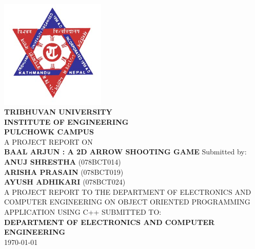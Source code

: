 
\begin{titlepage}
	
	\newcommand{\HRule}{\rule{\linewidth}{0.3mm}}
	\centering
	\vfill
	\includegraphics[width=50mm]{images/tu.jpg}\\[0.75cm]
	\textsc{\Large \bfseries  TRIBHUVAN UNIVERSITY}\\[0.25cm] %
	\textsc{\Large \bfseries INSTITUTE OF ENGINEERING}\\[0.25cm]
	\textsc{\Large \bfseries  PULCHOWK CAMPUS}\\
	\vfill
	\large {A PROJECT REPORT ON }\\
	\Large \textbf{BAAL ARJUN : A 2D ARROW SHOOTING GAME}
	\vfill
	\large
	Submitted by:\\
	\textbf{ANUJ SHRESTHA} (078BCT014)\\
	\textbf{ARISHA PRASAIN} (078BCT019)\\
	\textbf{AYUSH ADHIKARI} (078BCT024)\\[0.5cm]
	\vfill
	\large
	A PROJECT REPORT TO THE DEPARTMENT OF ELECTRONICS AND COMPUTER
	ENGINEERING ON OBJECT ORIENTED PROGRAMMING APPLICATION USING
	C++
	\vfill
	SUBMITTED TO:\\
	\textbf{DEPARTMENT OF ELECTRONICS AND COMPUTER ENGINEERING}
	\\
	\vfill
	{\large \today}
	\vfill
\end{titlepage}
